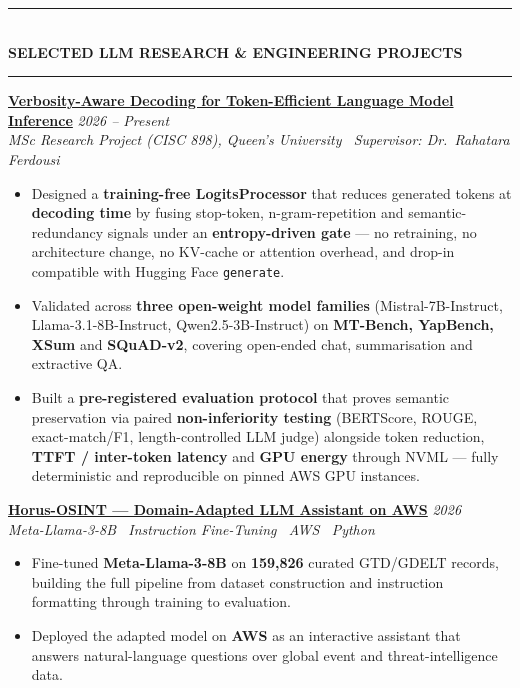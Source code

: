 \documentclass[10pt, a4paper]{article}
\newcommand{\cvsection}[1]{%
  \vspace{3pt}%
  {\color{navy}\rule{\linewidth}{1.1pt}}\\[0.5pt]%
  {\color{navy}\bfseries\fontsize{9.5}{11}\selectfont\uppercase{#1}}\\[-4pt]%
  {\color{teal}\rule{\linewidth}{0.6pt}}%
  \vspace{2pt}%
}
\newcommand{\cvproject}[3]{%
  \vspace{2.5pt}%
  {\bfseries\color{navy}#1} \hfill {\color{midgray}\textit{#3}}\\[-1.5pt]%
  {\color{teal}\textit{#2}}%
}
\newenvironment{cvitems}{%
  \begin{itemize}[leftmargin=11pt, itemsep=0.5pt, parsep=0pt, topsep=1pt,
                  label={\textcolor{teal}{$\bullet$}}]
}{%
  \end{itemize}%
}
\begin{document}
\cvsection{Selected LLM Research \& Engineering Projects}

\cvproject{\href{https://github.com/MahmoudAlyosify/minimal-lm}{Verbosity-Aware Decoding for Token-Efficient Language Model Inference}}
          {MSc Research Project (CISC 898), Queen's University \textperiodcentered\ Supervisor: Dr.\ Rahatara Ferdousi}
          {2026 -- Present}
\begin{cvitems}
  \item Designed a \textbf{training-free LogitsProcessor} that reduces generated tokens at \textbf{decoding time} by fusing stop-token, n-gram-repetition and semantic-redundancy signals under an \textbf{entropy-driven gate} --- no retraining, no architecture change, no KV-cache or attention overhead, and drop-in compatible with Hugging Face \texttt{generate}.
  \item Validated across \textbf{three open-weight model families} (Mistral-7B-Instruct, Llama-3.1-8B-Instruct, Qwen2.5-3B-Instruct) on \textbf{MT-Bench, YapBench, XSum} and \textbf{SQuAD-v2}, covering open-ended chat, summarisation and extractive QA.
  \item Built a \textbf{pre-registered evaluation protocol} that proves semantic preservation via paired \textbf{non-inferiority testing} (BERTScore, ROUGE, exact-match/F1, length-controlled LLM judge) alongside token reduction, \textbf{TTFT / inter-token latency} and \textbf{GPU energy} through NVML --- fully deterministic and reproducible on pinned AWS GPU instances.
\end{cvitems}

\cvproject{\href{https://github.com/MahmoudAlyosify/Horus-OSINT}{Horus-OSINT --- Domain-Adapted LLM Assistant on AWS}}
          {Meta-Llama-3-8B \textperiodcentered\ Instruction Fine-Tuning \textperiodcentered\ AWS \textperiodcentered\ Python}
          {2026}
\begin{cvitems}
  \item Fine-tuned \textbf{Meta-Llama-3-8B} on \textbf{159,826} curated GTD/GDELT records, building the full pipeline from dataset construction and instruction formatting through training to evaluation.
  \item Deployed the adapted model on \textbf{AWS} as an interactive assistant that answers natural-language questions over global event and threat-intelligence data.
\end{cvitems}
\end{document}
